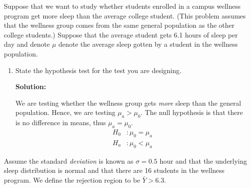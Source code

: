 Suppose that we want to study whether students enrolled in a campus wellness program get more sleep than the average college student.  (This problem assumes that the wellness group comes from the same general population as the other college students.)  Suppose that the average student gets 6.1 hours of sleep per day and denote $\mu$ denote the average sleep gotten by a student in the wellness population.
\begin{enumerate}[label=(\alph*)]
    \item State the hypothesis test for the test you are designing.
    \begin{mybox}
        \textbf{Solution: }

        \nl We are testing whether the wellness group gets \textit{more} sleep than the general population. Hence, we are testing $\mu_a > \mu_0$. The null hypothesis is that there is no difference in means, thus $\mu_a = \mu_0$. 
        \begin{align*}
            H_0 &: \mu_0 = \mu_a
            \\ H_a &: \mu_0 < \mu_a
        \end{align*}
    \end{mybox}
\end{enumerate}
Assume the standard \textit{deviation} is known as $\sigma=0.5$ hour and that the underlying sleep distribution is normal and that there are 16 students in the wellness program.  We define the rejection region to be $\bar{Y}>6.3$.
